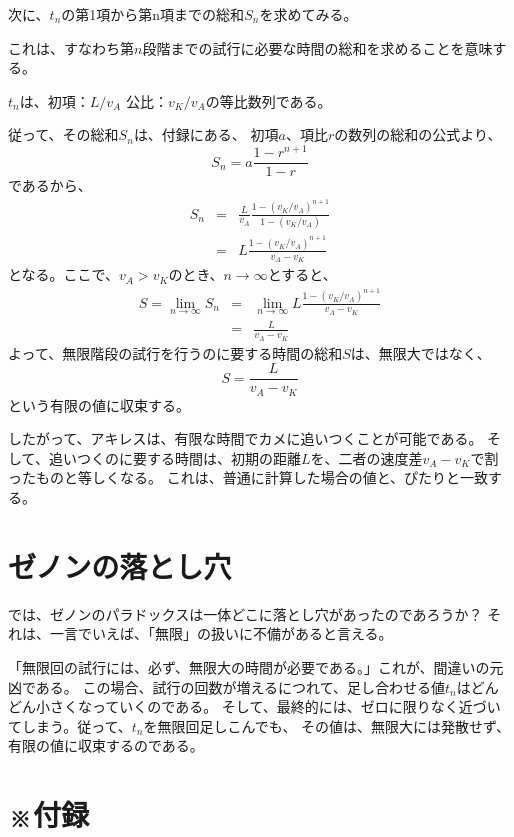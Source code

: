 \documentclass[12pt,a4paper,fleqn]{ltjsarticle}
\begin{document}
次に、$t_n$の第1項から第n項までの総和$S_n$を求めてみる。

これは、すなわち第$n$段階までの試行に必要な時間の総和を求めることを意味する。

$t_n$は、初項：$L/v_A$ 公比：$v_K/v_A$の等比数列である。

従って、その総和$S_n$は、付録にある、
初項$a$、項比$r$の数列の総和の公式より、
\begin{displaymath}
  S_n = a\frac{1-r^{n+1}}{1-r} \tag{$**$}
\end{displaymath}
であるから、
\begin{eqnarray*}
  S_n &=& \frac{L}{v_A}\frac{1-(v_K/v_A)^{n+1}}{1-(v_K/v_A)} \\
      &=& L\frac{1-(v_K/v_A)^{n+1}}{v_A-v_K}
\end{eqnarray*}
となる。ここで、$v_A > v_K$のとき、$n\rightarrow \infty$とすると、
\begin{eqnarray*}
  S = \lim_{n\to \infty}S_n &=& \lim_{n\to \infty}L\frac{1-(v_K/v_A)^{n+1}}{v_A-v_K} \\
                        &=& \frac{L}{v_A - v_K}
\end{eqnarray*}
よって、無限階段の試行を行うのに要する時間の総和$S$は、無限大ではなく、
\begin{displaymath}
  S = \frac{L}{v_A - v_K}
\end{displaymath}
という有限の値に収束する。

したがって、アキレスは、有限な時間でカメに追いつくことが可能である。
そして、追いつくのに要する時間は、初期の距離$L$を、二者の速度差$v_A-v_K$で割ったものと等しくなる。
これは、普通に計算した場合の値と、ぴたりと一致する。

\section{ゼノンの落とし穴}

では、ゼノンのパラドックスは一体どこに落とし穴があったのであろうか？
それは、一言でいえば、「無限」の扱いに不備があると言える。

「無限回の試行には、必ず、無限大の時間が必要である。」これが、間違いの元凶である。
この場合、試行の回数が増えるにつれて、足し合わせる値$t_n$はどんどん小さくなっていくのである。
そして、最終的には、ゼロに限りなく近づいてしまう。従って、$t_n$を無限回足しこんでも、
その値は、無限大には発散せず、有限の値に収束するのである。

\newpage

\section{※付録}
\end{document}
